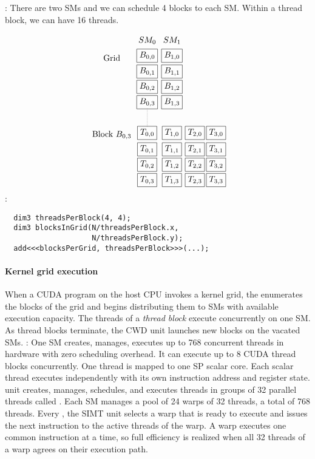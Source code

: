 \documentclass{myart}
\begin{document}
\w {}: There are two SMs and we can schedule 4 blocks to each SM.
Within a thread block, we can have 16 threads.
{\small
\[ \xymatrix@-1.8pc{
  & SM_0 & SM_1 & & \\ 
  \txt{Grid} &  *+[F]{B_{0,0}} & *+[F]{B_{1,0}} &&\\
  &*+[F]{B_{0,1}} & *+[F]{B_{1,1}} &&\\
  &*+[F]{B_{0,2}} & *+[F]{B_{1,2}} &&\\
  &*+[F]{B_{0,3}} \ar@{.}[ddd] & *+[F]{B_{1,3}} &&\\ \\ \\
  \txt{Block $B_{0,3}$}& *+[F]{T_{0,0}} & *+[F]{T_{1,0}} &  *+[F]{T_{2,0}} & *+[F]{T_{3,0}} \\
  &*+[F]{T_{0,1}} & *+[F]{T_{1,1}} &  *+[F]{T_{2,1}} & *+[F]{T_{3,1}} \\
  &*+[F]{T_{0,2}} & *+[F]{T_{1,2}} &  *+[F]{T_{2,2}} & *+[F]{T_{3,2}} \\
  &*+[F]{T_{0,3}} & *+[F]{T_{1,3}} &  *+[F]{T_{2,3}} & *+[F]{T_{3,3}}
}\]
\w {}:
  \begin{verbatim}
  dim3 threadsPerBlock(4, 4);  
  dim3 blocksInGrid(N/threadsPerBlock.x,
                    N/threadsPerBlock.y);
  add<<<blocksPerGrid, threadsPerBlock>>>(...);
  \end{verbatim}
}
\eit

\paragraph{Kernel grid execution}
\bit
\w When a CUDA program on the host CPU invokes a kernel grid, the  enumerates the blocks of the grid and
begins distributing them to SMs with available execution capacity.
\w The threads of a {\em thread block\/} execute concurrently on one SM.
\w As thread blocks terminate, the CWD unit launches new blocks on the
vacated SMs.
\w {}:
  \bit
  \w One SM creates, manages, executes up to 768 concurrent threads in hardware
  with zero scheduling overhead.
  \w It can execute up to 8 CUDA thread blocks concurrently.
  \w {}
  \w One thread is mapped to one SP scalar core.
  \w Each scalar thread executes independently with its own instruction
  address and register state. 
  \w {} unit creates, manages, schedules, and executes threads in
  groups of 32 parallel threads called . 
  \w Each SM manages a pool of 24 warps of 32 threads, a total of 768
  threads. 
  \w Every , the SIMT unit selects a warp that is
  ready to execute and issues the next instruction to the active threads of
  the warp. 
  \w A warp executes one common instruction at a time, so full efficiency is
  realized when all 32 threads of a warp agrees on their execution path. 
  \eit
\eit
\end{document}

